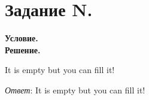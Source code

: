 \section{Задание N.}

\textbf{Условие.}\\


\vspace{10mm}
\textbf{Решение.}

It is empty but you can fill it!

\textit{Ответ}:  It is empty but you can fill it!
\clearpage
